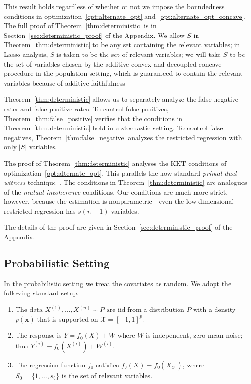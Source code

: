 This result holds regardless of whether or not we impose the
boundedness conditions in optimization~\eqref{opt:alternate_opt}
and~\eqref{opt:alternate_opt_concave}.  The full proof of
Theorem~\ref{thm:deterministic} is in
Section~\ref{sec:deterministic_proof} of the Appendix. We allow $S$ in
Theorem~\ref{thm:deterministic} to be any set containing the relevant
variables; in Lasso analysis, $S$ is taken to be the set of relevant
variables; we will take $S$ to be the set of variables chosen by the
additive convex and decoupled concave procedure in the population
setting, which is guaranteed to contain the relevant variables because
of additive faithfulness.

Theorem~\ref{thm:deterministic} allows us to separately analyze the false negative
rates and false positive rates. To control false positives,
Theorem~\ref{thm:false_positive} verifies that the conditions in Theorem~\ref{thm:deterministic} hold in a stochastic setting. To control
false negatives, Theorem~\ref{thm:false_negative} analyzes the restricted regression with only $|S|$ variables.

The proof of Theorem~\ref{thm:deterministic} analyses the KKT
conditions of optimization~\eqref{opt:alternate_opt}.  This parallels
the now standard \emph{primal-dual witness}
technique~\citep{wainwright2009sharp}. The conditions in
Theorem~\ref{thm:deterministic} are analogues of the \emph{mutual
  incoherence} conditions. Our conditions are much more strict, however,
because the estimation is nonparametric---even the low dimensional
restricted regression has $s(n-1)$ variables.

The details of the proof are given in
Section~\ref{sec:deterministic_proof} of the Appendix.

\subsection{Probabilistic Setting}
\label{sec:probabilistic_setting}

In the probabilistic setting we treat the covariates as random.  We
adopt the following standard setup:

\begin{enumerate}
\item The data $X^{(1)},\ldots, X^{(n)} \sim P$ are iid from
a distribution $P$ with a density $p(\mathbf{x})$ that is supported on $\mathcal{X}=[-1,1]^p$.
\item The response is $Y = f_0(X) + W$ where $W$ is
  independent, zero-mean noise; thus $Y^{(i)} = f_0(X^{(i)}) + W^{(i)}$.
\item The regression function $f_0$ satisfies
$f_0(X) = f_0(X_{S_0})$, where $S_0 = \{1,\ldots,s_0\}$ is the set of
relevant variables.
\end{enumerate}


